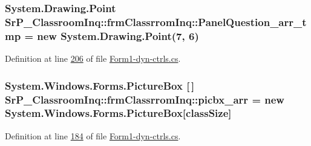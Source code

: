 \hypertarget{class_sr_p___classroom_inq_1_1frm_classrrom_inq_a3e546b9b0c603a788d0316efe572c960}{
\subsubsection[{\-Panel\-Question\-\_\-arr\-\_\-tmp}]{\setlength{\rightskip}{0pt plus 5cm}\-System.\-Drawing.\-Point {\bf \-Sr\-P\-\_\-\-Classroom\-Inq\-::frm\-Classrrom\-Inq\-::\-Panel\-Question\-\_\-arr\-\_\-tmp} = new \-System.\-Drawing.\-Point(7, 6)}}
\label{class_sr_p___classroom_inq_1_1frm_classrrom_inq_a3e546b9b0c603a788d0316efe572c960}


\-Definition at line \hyperlink{_form1-dyn-ctrls_8cs_source_l00206}{206} of file \hyperlink{_form1-dyn-ctrls_8cs_source}{\-Form1-\/dyn-\/ctrls.\-cs}.

\hypertarget{class_sr_p___classroom_inq_1_1frm_classrrom_inq_a067a85853fc3e38cf6343917c4fb061a}{
\subsubsection[{picbx\-\_\-arr}]{\setlength{\rightskip}{0pt plus 5cm}\-System.\-Windows.\-Forms.\-Picture\-Box \mbox{[}$\,$\mbox{]} {\bf \-Sr\-P\-\_\-\-Classroom\-Inq\-::frm\-Classrrom\-Inq\-::picbx\-\_\-arr} = new \-System.\-Windows.\-Forms.\-Picture\-Box\mbox{[}{\bf class\-Size}\mbox{]}}}
\label{class_sr_p___classroom_inq_1_1frm_classrrom_inq_a067a85853fc3e38cf6343917c4fb061a}


\-Definition at line \hyperlink{_form1-dyn-ctrls_8cs_source_l00184}{184} of file \hyperlink{_form1-dyn-ctrls_8cs_source}{\-Form1-\/dyn-\/ctrls.\-cs}.

